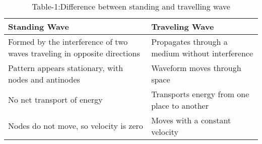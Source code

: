 \documentclass[journal,12pt,twocolumn]{IEEEtran}
\theoremstyle{remark}
\begin{document}
\solution \\
\begin{table}[h]
  \centering
\begin{tabular}{|m{10em}|m{10em}|}
\hline
\textbf{Standing Wave} & \textbf{Traveling Wave} \\
\hline
Formed by the interference of two waves traveling in opposite directions & Propagates through a medium without interference \\
\hline
Pattern appears stationary, with nodes and antinodes & Waveform moves through space \\
\hline
No net transport of energy & Transports energy from one place to another \\
\hline
Nodes do not move, so velocity is zero & Moves with a constant velocity \\
\hline
\end{tabular}
 \caption{Table-1:Difference between standing and travelling wave}
 \label{tab:my}
\end{table}
\end{document}
